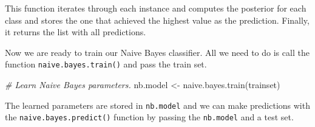 \documentclass[
  11pt,
]{krantz}
\newenvironment{Shaded}{\begin{snugshade}}{\end{snugshade}}
\newcommand{\CommentTok}[1]{\textcolor[rgb]{0.37,0.37,0.37}{\textit{#1}}}
\newcommand{\ControlFlowTok}[1]{\textcolor[rgb]{0.27,0.27,0.27}{\textbf{#1}}}
\newcommand{\DecValTok}[1]{\textcolor[rgb]{0.06,0.06,0.06}{#1}}
\newcommand{\FunctionTok}[1]{\textcolor[rgb]{0,0,0}{#1}}
\newcommand{\NormalTok}[1]{#1}
\newcommand{\OtherTok}[1]{\textcolor[rgb]{0.37,0.37,0.37}{#1}}
\newcommand{\SpecialCharTok}[1]{\textcolor[rgb]{0,0,0}{#1}}
\begin{document}
\begin{Shaded}
\end{Shaded}

This function iterates through each instance and computes the posterior for each class and stores the one that achieved the highest value as the prediction. Finally, it returns the list with all predictions.

Now we are ready to train our Naive Bayes classifier. All we need to do is call the function \texttt{naive.bayes.train()} and pass the train set.

\begin{Shaded}
\begin{Highlighting}[]
\CommentTok{\# Learn Naive Bayes parameters.}
\NormalTok{nb.model }\OtherTok{\textless{}{-}} \FunctionTok{naive.bayes.train}\NormalTok{(trainset)}
\end{Highlighting}
\end{Shaded}

The learned parameters are stored in \texttt{nb.model} and we can make predictions with the \texttt{naive.bayes.predict()} function by passing the \texttt{nb.model} and a test set.
\end{document}
